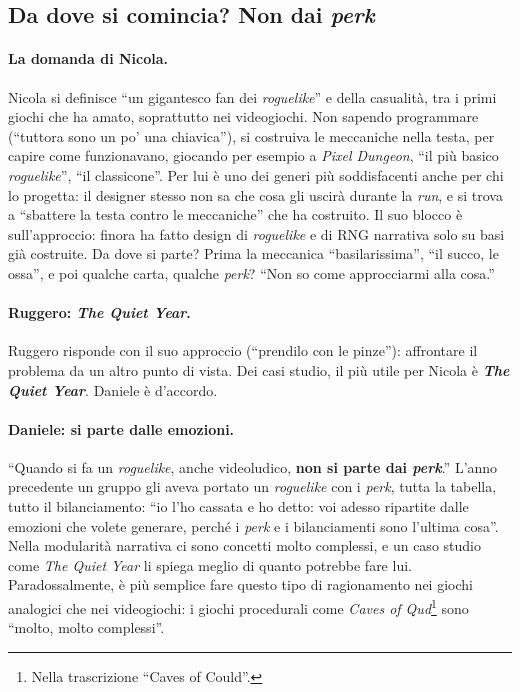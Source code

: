 \subsection{Da dove si comincia? Non dai \emph{perk}}

\paragraph{La domanda di Nicola.} Nicola si definisce ``un gigantesco fan dei
\emph{roguelike}'' e della casualità, tra i primi giochi che ha amato, soprattutto nei
videogiochi. Non sapendo programmare (``tuttora sono un po' una chiavica''), si costruiva
le meccaniche nella testa, per capire come funzionavano, giocando per esempio a
\emph{Pixel Dungeon}, ``il più basico \emph{roguelike}'', ``il classicone''. Per lui è uno
dei generi più soddisfacenti anche per chi lo progetta: il designer stesso non sa che cosa
gli uscirà durante la \emph{run}, e si trova a ``sbattere la testa contro le meccaniche''
che ha costruito. Il suo blocco è sull'approccio: finora ha fatto design di
\emph{roguelike} e di RNG narrativa solo su basi già costruite. Da dove si parte? Prima la
meccanica ``basilarissima'', ``il succo, le ossa'', e poi qualche carta, qualche
\emph{perk}? ``Non so come approcciarmi alla cosa.''

\paragraph{Ruggero: \emph{The Quiet Year}.} Ruggero risponde con il suo approccio (``prendilo
con le pinze''): affrontare il problema da un altro punto di vista. Dei casi studio, il
più utile per Nicola è \textbf{\emph{The Quiet Year}}. Daniele è d'accordo.

\paragraph{Daniele: si parte dalle emozioni.} ``Quando si fa un \emph{roguelike}, anche
videoludico, \textbf{non si parte dai \emph{perk}}.'' L'anno precedente un gruppo gli aveva
portato un \emph{roguelike} con i \emph{perk}, tutta la tabella, tutto il bilanciamento:
``io l'ho cassata e ho detto: voi adesso ripartite dalle emozioni che volete generare,
perché i \emph{perk} e i bilanciamenti sono l'ultima cosa''. Nella modularità narrativa ci
sono concetti molto complessi, e un caso studio come \emph{The Quiet Year} li spiega meglio
di quanto potrebbe fare lui. Paradossalmente, è più semplice fare questo tipo di
ragionamento nei giochi analogici che nei videogiochi: i giochi procedurali come
\emph{Caves of Qud}\footnote{Nella trascrizione ``Caves of Could''.} sono ``molto, molto
complessi''.

